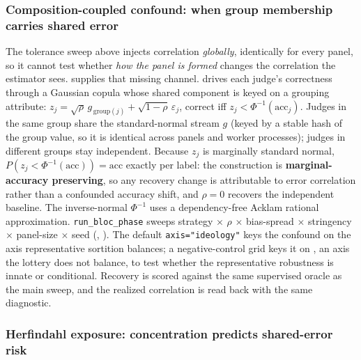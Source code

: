 \documentclass[
]{article}
\begin{document}
\subsubsection{Composition-coupled confound: when group membership
carries shared
error}\label{composition-coupled-confound-when-group-membership-carries-shared-error}

The tolerance sweep above injects correlation \emph{globally},
identically for every panel, so it cannot test whether \emph{how the
panel is formed} changes the correlation the estimator sees.
 supplies that missing channel.
drives each judge's correctness through a Gaussian copula whose shared
component is keyed on a grouping attribute:
\(z_j = \sqrt{\rho}\,g_{\,\mathrm{group}(j)}
+ \sqrt{1-\rho}\,\varepsilon_j\), correct iff
\(z_j < \Phi^{-1}(\mathrm{acc}_j)\). Judges in the same group share the
standard-normal stream \(g\) (keyed by a stable hash of the group value,
so it is identical across panels and worker processes); judges in
different groups stay independent. Because \(z_j\) is marginally
standard normal, \(P(z_j < \Phi^{-1}(\mathrm{acc})) = \mathrm{acc}\)
exactly per label: the construction is \textbf{marginal-accuracy
preserving}, so any recovery change is attributable to error correlation
rather than a confounded accuracy shift, and \(\rho=0\) recovers the
independent baseline. The inverse-normal \(\Phi^{-1}\) uses a
dependency-free Acklam rational approximation. \texttt{run\_bloc\_phase}
sweeps strategy \texorpdfstring{\ensuremath{\times}}{x} \(\rho\) \texorpdfstring{\ensuremath{\times}}{x} bias-spread \texorpdfstring{\ensuremath{\times}}{x} stringency \texorpdfstring{\ensuremath{\times}}{x} panel-size \texorpdfstring{\ensuremath{\times}}{x}
seed (,
). The default
\texttt{axis="ideology"} keys the confound on the axis representative
sortition balances; a negative-control grid keys it on
, an axis the lottery does not balance,
to test whether the representative robustness is innate or conditional.
Recovery is scored against the same supervised oracle as the main sweep,
and the realized correlation is read back with the same
 diagnostic.

\subsubsection{Herfindahl exposure: concentration predicts shared-error
risk}\label{herfindahl-exposure-concentration-predicts-shared-error-risk}
\end{document}
